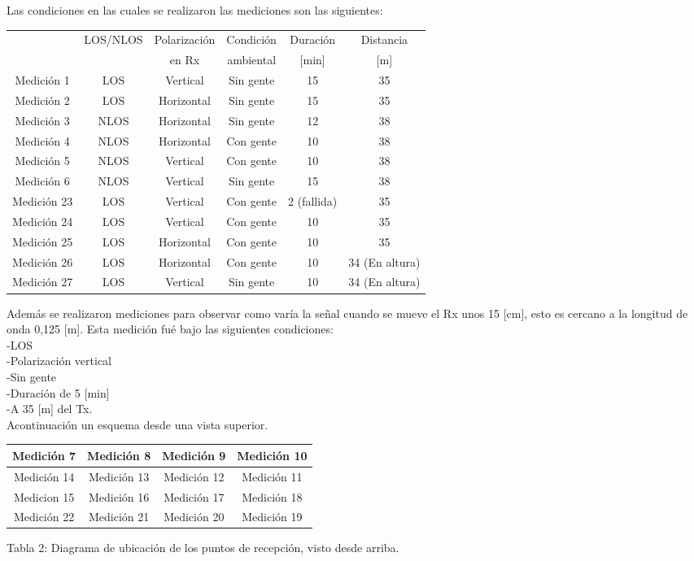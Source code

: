 \documentclass[12pt]{article}
\begin{document}
Las condiciones en las cuales se realizaron las mediciones son las siguientes:
\begin{center}
	\begin{tabular}{| c | c | c | c | c | c |} \hline
   & LOS/NLOS & Polarización & Condición & Duración & Distancia  \\ 
   & 		& en Rx & ambiental & [min] & [m]  \\ \hline 
Medición 1 & LOS	& Vertical	& Sin gente	& 15 & 35 \\ \hline
Medición 2 & LOS	& Horizontal	& Sin gente	& 15 & 35 \\ \hline
Medición 3 & NLOS	& Horizontal	& Sin gente	& 12 & 38	\\ \hline
Medición 4 & NLOS	& Horizontal	& Con gente	& 10 & 38	\\ \hline
Medición 5 & NLOS	& Vertical	& Con gente	& 10 & 38	\\ \hline
Medición 6 & NLOS	& Vertical	& Sin gente	& 15 & 38	\\ \hline
Medición 23 & LOS	& Vertical	& Con gente	& 2 (fallida) & 35	\\ \hline
Medición 24 & LOS	& Vertical	& Con gente	& 10 & 35	\\ \hline
Medición 25 & LOS	& Horizontal	& Con gente	& 10 & 35	\\  \hline
Medición 26 & LOS	& Horizontal	& Con gente	& 10 &	34 (En altura)\\ \hline
Medición 27 & LOS	& Vertical	& Sin gente	& 10 & 34 (En altura)	\\ \hline
	\end{tabular}
\end{center}


Además se realizaron mediciones para observar como varía la señal cuando se mueve el Rx 
unos 15 [cm], esto es cercano a la longitud de onda 0,125 [m]. Esta medición fué bajo las 
siguientes condiciones:\\
-LOS\\ -Polarización vertical\\ -Sin gente\\ -Duración de 5 [min]\\ -A 35 [m] del Tx.\\

Acontinuación un esquema desde una vista superior.\\
\begin{center}
	\begin{tabular}{| c | c | c | c |} \hline
	Medición 7 & Medición 8 & Medición 9 & Medición 10 \\ \hline
	Medición 14 & Medición 13 & Medición 12 & Medición 11 \\ \hline
	Medicion 15 & Medición 16 & Medición 17 & Medición 18 \\ \hline
	Medición 22 & Medición 21 & Medición 20 & Medición 19 \\ \hline
	\end{tabular}
\end{center}
\footnotesize 
\begin{center}
Tabla 2: Diagrama de ubicación de los puntos de recepción, visto desde arriba.
\end{center}
\normalsize
\end{document}
